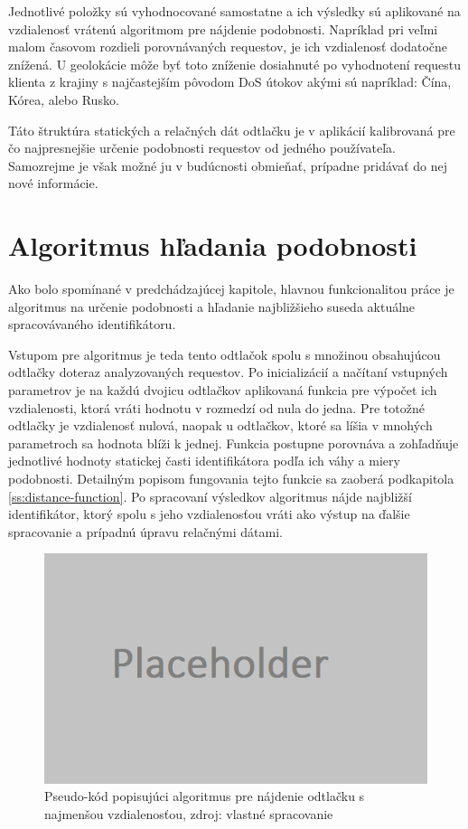 \documentclass[
  printed, %
  table,   %
  lof,     %
  lot,     %
]{fithesis3}
\begin{document}
Jednotlivé položky sú vyhodnocované samostatne a ich výsledky sú aplikované na
vzdialenosť vrátenú algoritmom pre nájdenie podobnosti. Napríklad pri veľmi
malom časovom rozdieli porovnávaných requestov, je ich vzdialenosť dodatočne
znížená. U geolokácie môže byť toto zníženie dosiahnuté po vyhodnotení requestu
klienta z krajiny s najčastejším pôvodom DoS útokov akými sú napríklad: Čína,
Kórea, alebo Rusko.

Táto štruktúra statických a relačných dát odtlačku je v aplikácií kalibrovaná
pre čo najpresnejšie určenie podobnosti requestov od jedného používateľa.
Samozrejme je však možné ju v budúcnosti obmieňať, prípadne pridávať do nej
nové informácie.

\section{Algoritmus hľadania podobnosti}
Ako bolo spomínané v predchádzajúcej kapitole, hlavnou funkcionalitou práce je
algoritmus na určenie podobnosti a hľadanie najbližšieho suseda aktuálne
spracovávaného identifikátoru. 

Vstupom pre algoritmus je teda tento odtlačok
spolu s množinou obsahujúcou odtlačky doteraz analyzovaných requestov. Po
inicializácií a načítaní vstupných parametrov je na každú dvojicu odtlačkov
aplikovaná funkcia pre výpočet ich vzdialenosti, ktorá vráti hodnotu v rozmedzí
od nula do jedna. Pre totožné odtlačky je vzdialenosť nulová, naopak u
odtlačkov, ktoré sa líšia v mnohých parametroch sa hodnota blíži k jednej.
Funkcia postupne porovnáva a zohľadňuje jednotlivé hodnoty statickej časti
identifikátora podľa ich váhy a miery podobnosti. Detailným popisom fungovania
tejto funkcie sa zaoberá podkapitola \ref{ss:distance-function}. Po spracovaní
výsledkov algoritmus nájde najbližší identifikátor, ktorý spolu s jeho
vzdialenosťou vráti ako výstup na ďalšie spracovanie a prípadnú úpravu
relačnými dátami.

\begin{figure}[h]
  \centering
    \includegraphics[width=.99\textwidth]{images/footprint-alg-pseudo.png}
  \caption{Pseudo-kód popisujúci algoritmus pre nájdenie odtlačku s najmenšou
  vzdialenosťou, zdroj: vlastné spracovanie}
  \label{fig:footprint-alg-pseudo}
\end{figure}
\end{document}
